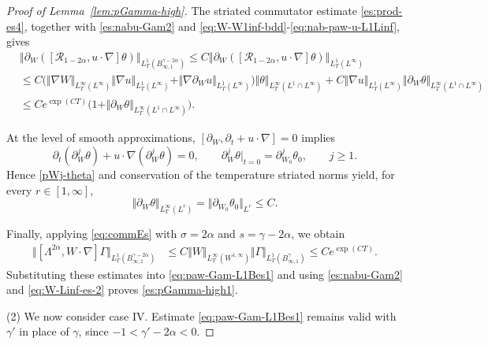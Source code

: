 \documentclass[reqno,11pt,a4paper]{amsart}
\begin{document}
\begin{proof}[Proof of Lemma~\ref{lem:pGamma-high}]
The striated commutator estimate \eqref{es:prod-es4},
together with \eqref{es:nabu-Gam2} and
\eqref{eq:W-W1inf-bdd}-\eqref{eq:nab-paw-u-L1Linf},
gives
\begin{align}\label{eq:paw-cm-es1}
  & \left\Vert \partial_W\left(\left[\mathcal{R}_{1-2\alpha}, u \cdot \nabla\right] \theta\right)
  \right\Vert _{L^1_T(B_{\infty, 1}^{\gamma-2\alpha})}
  \leq C \left\Vert \partial_W\left(\left[\mathcal{R}_{1-2\alpha}, u \cdot \nabla\right] \theta\right)
  \right\Vert _{L^1_T(L^\infty)} \nonumber \\
  & \leq C \big(\Vert \nabla W\Vert _{L^\infty_T(L^\infty)} \Vert \nabla u\Vert _{L^1_T(L^\infty)} 
  + \Vert \nabla \partial_W u\Vert _{L^1_T(L^\infty)} \big) 
  \Vert \theta\Vert _{L^\infty_T(L^1\cap L^\infty)} 
  + C \Vert \nabla u\Vert _{L^1_T(L^\infty)} 
  \Vert \partial_W \theta\Vert _{L^\infty_T(L^1\cap L^\infty)} \nonumber \\
  & \leq C e^{\exp(CT)}\big( 1 + \Vert \partial_W \theta\Vert _{L^\infty_T(L^1\cap L^\infty)}
  \big).
\end{align}

At the level of smooth approximations,
$[\partial_W,\partial_t+u\cdot\nabla]=0$ implies
\begin{equation}\label{eq:parWj-the}
  \partial_t(\partial_W^j\theta)
  +u\cdot\nabla(\partial_W^j\theta)=0,
  \qquad
  \partial_W^j\theta|_{t=0}
  =\partial_{W_0}^j\theta_0,
  \qquad j\geq1.
\end{equation}
Hence \eqref{pWj-theta} and conservation of the
temperature striated norms yield, for every $r\in[1,\infty]$,
\begin{equation}\label{eq:paw-the-Lp}
  \Vert \partial_W\theta\Vert _{L^\infty_T(L^r)}
  =\Vert \partial_{W_0}\theta_0\Vert _{L^r}
  \leq C.
\end{equation}

Finally, applying \eqref{eq:commEs} with
$\sigma=2\alpha$ and $s=\gamma-2\alpha$, we obtain
\begin{align*}
  \Vert [\Lambda^{2\alpha},W\cdot\nabla]\Gamma
    \Vert _{L^1_T(B^{\gamma-2\alpha}_{\infty,1})}
  &\leq
  C\Vert W\Vert _{L^\infty_T(W^{1,\infty})}
    \Vert \Gamma\Vert _{L^1_T(B^\gamma_{\infty,1})}
  \leq Ce^{\exp(CT)}.
\end{align*}
Substituting these estimates into
\eqref{eq:paw-Gam-L1Bes1} and using
\eqref{es:nabu-Gam2} and \eqref{eq:W-Linf-es-2}
proves \eqref{es:pGamma-high1}.

\medskip
\noindent
(2) We now consider case IV.
Estimate \eqref{eq:paw-Gam-L1Bes1} remains valid
with $\gamma'$ in place of $\gamma$, since
$-1<\gamma'-2\alpha<0$.


\end{proof}
\end{document}
